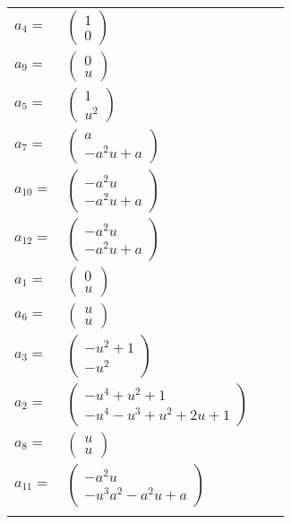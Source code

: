 \documentclass[1p]{elsarticle_modified}
\theoremstyle{definition}
\begin{document}
\begin{tabular}{m{7pt} m{180pt} m{7pt} m{180pt} }
\flushright $a_{4}=$&$\begin{pmatrix}1\\0\end{pmatrix}$ \\
\flushright $a_{9}=$&$\begin{pmatrix}0\\u\end{pmatrix}$ \\
\flushright $a_{5}=$&$\begin{pmatrix}1\\u^2\end{pmatrix}$ \\
\flushright $a_{7}=$&$\begin{pmatrix}a\\- a^2 u+a\end{pmatrix}$ \\
\flushright $a_{10}=$&$\begin{pmatrix}- a^2 u\\- a^2 u+a\end{pmatrix}$ \\
\flushright $a_{12}=$&$\begin{pmatrix}- a^2 u\\- a^2 u+a\end{pmatrix}$ \\
\flushright $a_{1}=$&$\begin{pmatrix}0\\u\end{pmatrix}$ \\
\flushright $a_{6}=$&$\begin{pmatrix}u\\u\end{pmatrix}$ \\
\flushright $a_{3}=$&$\begin{pmatrix}- u^2+1\\- u^2\end{pmatrix}$ \\
\flushright $a_{2}=$&$\begin{pmatrix}- u^4+u^2+1\\- u^4- u^3+u^2+2 u+1\end{pmatrix}$ \\
\flushright $a_{8}=$&$\begin{pmatrix}u\\u\end{pmatrix}$ \\
\flushright $a_{11}=$&$\begin{pmatrix}- a^2 u\\- u^3 a^2- a^2 u+a\end{pmatrix}$\\&\end{tabular}
\end{document}
